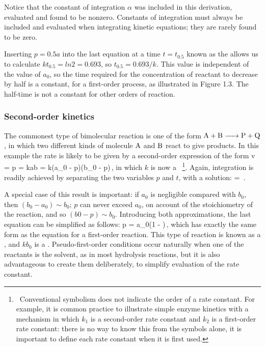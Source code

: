 Notice that the constant of integration $\alpha$ was included in this derivation, evaluated and found to be nonzero. Constants of integration must always be included and evaluated when integrating kinetic equations; they are rarely found to be zero.

Inserting $p = 0.5a$ into the last equation at a time $t = t_{0.5}$ known as the  allows us to calculate $kt_{0.5} = ln 2 = 0.693$, so $t_{0.5} = 0.693/k$. This value is independent of the value of $a_0$, so the time required for the concentration of reactant to decrease by half is a constant, for a first-order process, as illustrated in Figure 1.3. The half-time is not a constant for other orders of reaction.


\subsubsection{Second-order kinetics}
The commonest type of bimolecular reaction is one of the form $\ce{A + B -> P + Q}$, in which two different kinds of molecule $\ce A$ and $\ce B$ react to give products. In this example the rate is likely to be given by a second-order expression of the form
\beq
v = \dt p = kab = k\left(a_0 - p\right)\left(b_0 - p\right)\,,
\eeq
in which $k$ is now a ~\footnote{~Conventional symbolism does not indicate the order of a rate constant. For example, it is common practice to illustrate simple enzyme kinetics with a mechanism in which $k_1$ is a second-order rate constant and $k_2$ is a first-order rate constant: there is no way to know this from the symbols alone, it is important to define each rate constant when it is first used.}. Again, integration is readily achieved by separating the two variables $p$ and $t$, with a solution:
\beq
{} = \exp{}\,.
\eeq

A special case of this result is important: if $a_0$ is negligible compared with $b_0$, then $\left(b_0 − a_0\right) \sim b_0$; $p$ can never exceed $a_0$, on account of the stoichiometry of the reaction, and so $\left(b0 − p\right) \sim b_0$. Introducing both approximations, the last equation can be simplified as follows:
\beq
p = a_0\left(1 - \exp{}\right)\,,
\eeq
which has exactly the same form as the equation for a first-order reaction. This type of reaction is known as a , and $kb_0$ is a . Pseudo-first-order conditions occur naturally when one of the reactants is the solvent, as in most hydrolysis reactions, but it is also advantageous to create them deliberately, to simplify evaluation of the rate constant.

